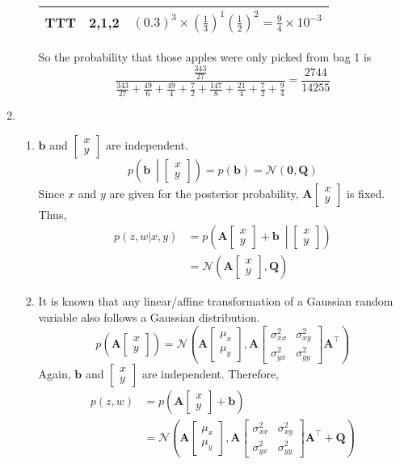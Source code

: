 \documentclass[11pt]{article}
\newcommand{\bmat}[1]{\begin{bmatrix}#1\end{bmatrix}}
\begin{document}
\begin{enumerate}
\begin{enumerate}
\begin{table}[H]
\begin{tabular}{|c|c|c|}
        TTT & 2,1,2 & $(0.3)^{3}\times\left(\frac{1}{3}\right)^{1}\left(\frac{1}{2}\right)^{2}=\frac{9}{4}\times 10^{-3}$ \\[1ex]\hline
        \end{tabular}
    \end{table}
    So the probability that those apples were only picked from bag 1 is
    \[\frac{\frac{343}{27}}{\frac{343}{27}+\frac{49}{6}+\frac{49}{4}+\frac{7}{2}+\frac{147}{8}+\frac{21}{4}+\frac{7}{2}+\frac{9}{4}}=\frac{2744}{14255}\]
\end{enumerate}
\item
    \begin{enumerate}
    \item 
    $\bm b$ and $\bmat{x\\y}$ are independent.
    \[p\left(\bm b \ \middle|\bmat{x\\y}\right)=p(\bm b)=\mathcal{N}(\bm 0,\bm Q)\]
    Since $x$ and $y$ are given for the posterior probability, $\bm A\bmat{x\\y}$ is fixed. Thus,
    \begin{align*}
    p(z,w|x,y) &= p\left(\bm A\bmat{x\\y}+\bm b \ \middle|\bmat{x\\y}\right) \\
    &= \mathcal{N}\left(\bm A\bmat{x\\y},\bm Q\right)
    \end{align*}
    \item
    It is known that any linear/affine transformation of a Gaussian random variable also follows a Gaussian distribution.
    \[p\left(\bm A\bmat{x\\y}\right)
    =\mathcal{N}\left(\bm A\bmat{\mu_{x}\\\mu_{y}},\bm A\bmat{\sigma_{xx}^{2}&\sigma_{xy}^{2}\\\sigma_{yx}^{2}&\sigma_{yy}^{2}}\bm A^{\top}\right)\]
    Again, $\bm b$ and $\bmat{x\\y}$ are independent. Therefore,
    \begin{align*}
    p(z,w) &= p\left(\bm A\bmat{x\\y}+\bm b\right) \\
    &= \mathcal{N}\left(\bm A\bmat{\mu_{x}\\\mu_{y}},\bm A\bmat{\sigma_{xx}^{2}&\sigma_{xy}^{2}\\\sigma_{yx}^{2}&\sigma_{yy}^{2}}\bm A^{\top}+\bm Q\right)
    \end{align*}
    \end{enumerate}

\end{enumerate}
\end{document}
